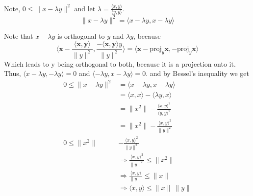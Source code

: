 \documentclass[letterpaper,12pt]{article}
\theoremstyle{definition}
\begin{document}
\\
Note,  $0\leq\|x-\lambda y\|^{2}$ and let $\lambda = \frac{\langle x,y\rangle }{\langle y,y\rangle }$.
\[\|x-\lambda y\|^{2} = \langle x-\lambda y, x-\lambda y\rangle \]

Note that $x-\lambda y$ is orthogonal to $y$ and $\lambda y$, because
\begin{equation*}
    \langle \mathbf{x} - \frac{\langle \mathbf{x}, \mathbf{y} \rangle}{\|y\|^2} ,\frac{ -\langle \mathbf{x}, \mathbf{y} \rangle y}{\|y\|^2}  \rangle = \langle \mathbf{x} -\text{proj}_y \mathbf{x} , -\text{proj}_y \mathbf{x} \rangle
\end{equation*}
Which leads to y being orthogonal to both, because it is a projection onto it.
Thus, $\langle x-\lambda y,-\lambda y\rangle  = 0$ and $\langle -\lambda y, x-\lambda y\rangle  = 0$. 
and by Bessel's inequality we get
 \begin{align*}
0 \leq \|x-\lambda y\|^{2} &= \langle x-\lambda y, x-\lambda y\rangle  \\
&= \langle x,x\rangle  - \langle \lambda y, x\rangle  \\
&= \| x^{2} \| - \frac{\langle x,y\rangle ^{2}}{\langle y,y\rangle ^{2}} \\
&= \| x^{2} \| - \frac{\langle x,y\rangle ^{2}}{\|y\|^{2}} \\
0 \leq \| x^{2} \| &- \frac{\langle x,y\rangle ^{2}}{\|y\|^{2}} \\
&\Rightarrow \frac{\langle x,y\rangle ^{2}}{\|y\|^{2}} \leq \| x^{2} \| \\
&\Rightarrow \frac{\langle x,y\rangle }{\|y\|} \leq \| x \| \\
&\Rightarrow \langle x,y\rangle  \leq \| x \| ~\| y \| \\
\end{align*}
\end{document}
